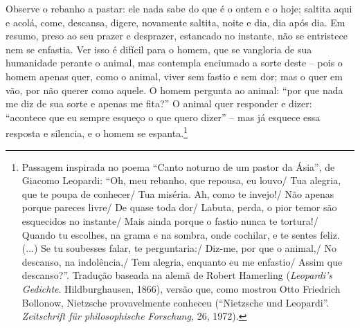 Observe o rebanho a pastar: ele nada sabe do que é o ontem e o hoje;
saltita aqui e acolá, come, descansa, digere, novamente saltita, noite e
dia, dia após dia. Em resumo, preso ao seu prazer e desprazer, estancado
no instante, não se entristece nem se enfastia. Ver isso é difícil para
o homem, que se vangloria de sua humanidade perante o animal, mas
contempla enciumado a sorte deste -- pois o homem apenas quer, como o
animal, viver sem fastio e sem dor; mas o quer em vão, por não querer
como aquele. O homem pergunta ao animal: ``por que nada me diz de sua
sorte e apenas me fita?'' O animal quer responder e dizer: ``acontece que eu
sempre esqueço o que quero dizer'' -- mas já esquece essa resposta e
silencia, e o homem se espanta.\footnote{Passagem inspirada no poema
  ``Canto noturno de um pastor da Ásia'', de Giacomo Leopardi: ``Oh, meu
  rebanho, que repousa, eu louvo/ Tua alegria, que te poupa de
  conhecer/ Tua miséria. Ah, como te invejo!/ Não apenas porque pareces
  livre/ De quase toda dor/ Labuta, perda, o pior temor são esquecidos no
  instante/ Mais ainda porque o fastio nunca te tortura!/ Quando tu
  escolhes, na grama e na sombra, onde cochilar, e te sentes feliz.
  (...) Se tu soubesses falar, te perguntaria:/ Diz-me, por que o
  animal,/ No descanso, na indolência,/ Tem alegria, enquanto eu me
  enfastio/ Assim que descanso?''. Tradução baseada na alemã de
  Robert Hamerling (\emph{Leopardi's Gedichte}. Hildburghausen, 1866),
  versão que, como mostrou Otto Friedrich Bollonow, Nietz\-sche
  provavelmente conheceu (``Nietz\-sche und Leopardi''. \emph{Zeitschrift
  für philosophische Forschung,} 26, 1972).}

